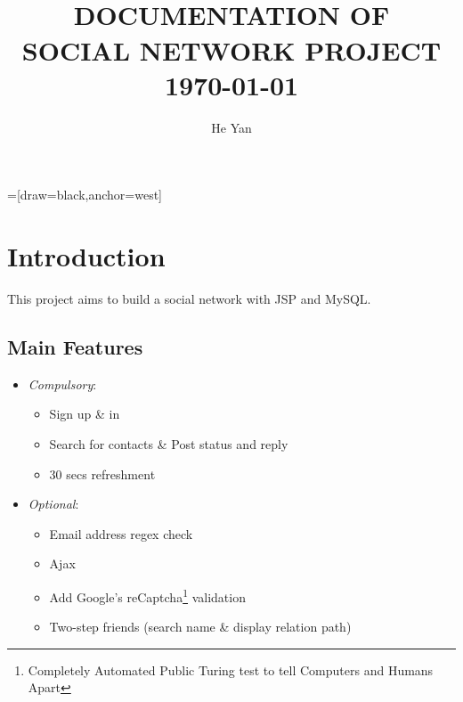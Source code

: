 


=[draw=black,anchor=west]
\title{
        \HRule{2pt}\\
        \LARGE \textbf{\uppercase{Documentation of\\ Social Network Project}}
        \HRule{2pt} \\ [0.5cm]
        \normalsize \today \vspace*{5\baselineskip}}

\date{}

\author{He Yan}

\maketitle
\tableofcontents
\setcounter{page}{0}
\thispagestyle{empty}
\newpage

\section{Introduction}

This project aims to build a social network with JSP and MySQL.

\subsection{Main Features}
\begin{itemize}
	\item \emph{Compulsory}:
		\begin{itemize}
			\item Sign up \& in
			\item Search for contacts \& Post status and reply
			\item 30 secs refreshment
		\end{itemize}
	\item \emph{Optional}:
		\begin{itemize}
			\item Email address regex check
			\item Ajax
			\item Add Google's reCaptcha\footnote{Completely Automated Public Turing test to tell Computers and Humans Apart} validation
			\item Two-step friends (search name \& display relation path)
		\end{itemize}
\end{itemize}

